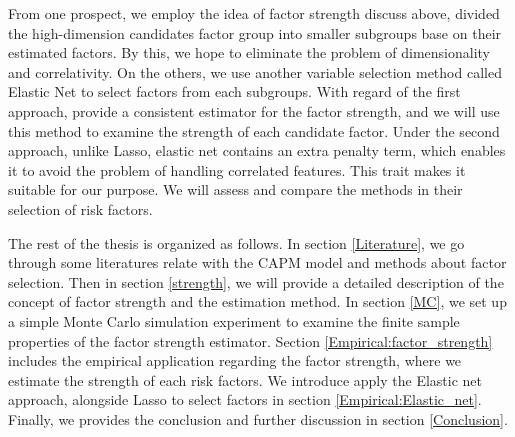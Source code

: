 From one prospect, we employ the idea of factor strength discuss above, divided the high-dimension candidates factor group into smaller subgroups base on their estimated factors.
By this, we hope to eliminate the problem of dimensionality and correlativity.
On the others, we use another variable selection method called Elastic Net \cite{Zou2005} to select factors from each subgroups.
With regard of the first approach,  provide a consistent estimator for the factor strength, and we will use this method to examine the strength of each candidate factor.
Under the second approach, unlike Lasso, elastic net contains an extra penalty term, which enables it to avoid the problem of handling correlated features.
This trait makes it suitable for our purpose.
We will assess and compare the methods in their selection of risk factors.


The rest of the thesis is organized as follows.
In section \ref{Literature}, we go through some literatures relate with the CAPM model and methods about factor selection.
Then in section \ref{strength}, we will provide a detailed description of the concept of factor strength and the estimation method.
In section \ref{MC}, we set up a simple Monte Carlo simulation experiment to examine the finite sample properties of the factor strength estimator.
Section \ref{Empirical:factor_strength} includes the empirical application regarding the factor strength, where we estimate the strength of each risk factors.
We introduce apply the Elastic net approach, alongside Lasso to select factors in section \ref{Empirical:Elastic_net}.
Finally, we provides the conclusion and further discussion in section \ref{Conclusion}.





